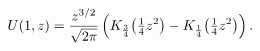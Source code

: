\[\mathop{U\/}\nolimits\!\left(1,z\right)=\frac{z^{3/2}}{\sqrt{2\pi}}\left(%
\mathop{K_{\frac{3}{4}}\/}\nolimits\!\left(\tfrac{1}{4}z^{2}\right)-\mathop{K_%
{\frac{1}{4}}\/}\nolimits\!\left(\tfrac{1}{4}z^{2}\right)\right).\]